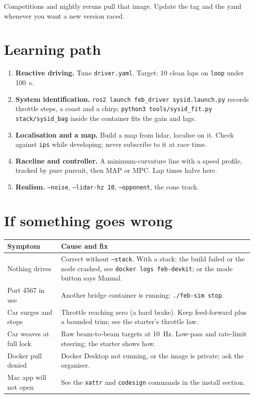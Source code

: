 \documentclass[11pt,a4paper]{article}
\newcommand{\file}[1]{\texttt{#1}}
\newcommand{\cmd}[1]{\texttt{#1}}
\begin{document}
Competitions and nightly reruns pull that image. Update the tag and the yaml whenever you
want a new version raced.

\section{Learning path}

\begin{enumerate}
  \item \textbf{Reactive driving.} Tune \file{driver.yaml}. Target: 10 clean laps on \texttt{loop} under 100~s.
  \item \textbf{System identification.} \cmd{ros2 launch feb\_driver sysid.launch.py} records throttle steps, a coast and a chirp; \cmd{python3 tools/sysid\_fit.py stack/sysid\_bag} inside the container fits the gain and lags.
  \item \textbf{Localisation and a map.} Build a map from lidar, localise on it. Check against \texttt{ips} while developing; never subscribe to it at race time.
  \item \textbf{Raceline and controller.} A minimum-curvature line with a speed profile, tracked by pure pursuit, then MAP or MPC. Lap times halve here.
  \item \textbf{Realism.} \texttt{--noise}, \texttt{--lidar-hz 10}, \texttt{--opponent}, the cone track.
\end{enumerate}

\section{If something goes wrong}

\begin{tabularx}{\linewidth}{lX}
\toprule
Symptom & Cause and fix\\
\midrule
Nothing drives & Correct without \texttt{--stack}. With a stack: the build failed or the node crashed, see \cmd{docker logs feb-devkit}; or the mode button says Manual.\\
Port 4567 in use & Another bridge container is running: \cmd{./feb-sim stop}.\\
Car surges and stops & Throttle reaching zero (a hard brake). Keep feed-forward plus a bounded trim; see the starter's throttle law.\\
Car weaves at full lock & Raw beam-to-beam targets at 10~Hz. Low-pass and rate-limit steering; the starter shows how.\\
Docker pull denied & Docker Desktop not running, or the image is private; ask the organiser.\\
Mac app will not open & See the \cmd{xattr} and \cmd{codesign} commands in the install section.\\
\bottomrule
\end{tabularx}
\end{document}
